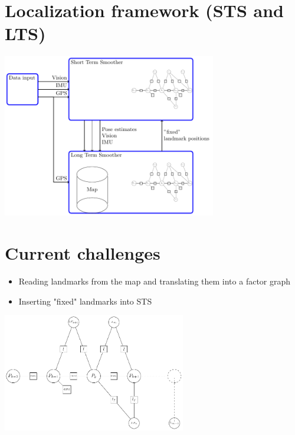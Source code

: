 \documentclass[%
    fourtothree=true, %
    DepLogo=true     %
    ]{ETHpres}
\begin{document}
\clearpage

\ETHslide		
\section*{Localization framework (STS and LTS)}
\begin{center}
\includegraphics[width=0.7\textwidth]{TikZ_drawings/STS_and_LTS/STS_and_LTS.pdf}\\
\end{center}

\clearpage

\ETHslide
\section*{Current challenges}
\begin{itemize}
	\item[\ETHitem] Reading landmarks from the map and translating them into a factor graph
	\item[\ETHitem] Inserting "fixed" landmarks into STS
\end{itemize}

\begin{center}
\includegraphics[width=0.6\textwidth]{TikZ_drawings/factor_graph_small/factor_graph.pdf}\\
\end{center}
\end{document}
